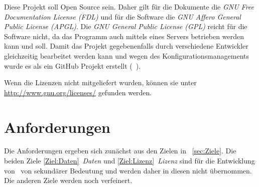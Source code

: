 Diese Projekt soll Open Source sein.
Daher gilt für die Dokumente die \emph{GNU Free Documentation License (FDL)}
und für die Software die \emph{GNU Affero General Public License (APGL)}.
Die \emph{GNU General Public License (GPL)} reicht für die Software nicht,
da das Programm auch mittels eines Servers betrieben werden kann und soll.
Damit das Projekt gegebenenfalls durch verschiedene Entwickler gleichzeitig
bearbeitet werden kann und wegen des Konfigurationsmanagements
wurde es als ein GitHub Projekt erstellt (\seename~\cite{bib:ASBA}).

Wenn die Lizenzen nicht mitgeliefert wurden,
können sie unter \url{http://www.gnu.org/licenses/} gefunden werden.

\section{Anforderungen}%
\label{sec:Anforderungen}

Die Anforderungen ergeben sich zunächst
aus den Zielen in \sectionname~\vref{sec:Ziele}.
Die beiden Ziele \ref{Ziel:Daten}~\emph{Daten}
und \ref{Ziel:Lizenz}~\emph{Lizenz}
sind für die Entwicklung von \ASBA\ von sekundärer Bedeutung
und werden daher in diesen \sectionname{} nicht übernommen.
Die anderen Ziele werden noch verfeinert.

